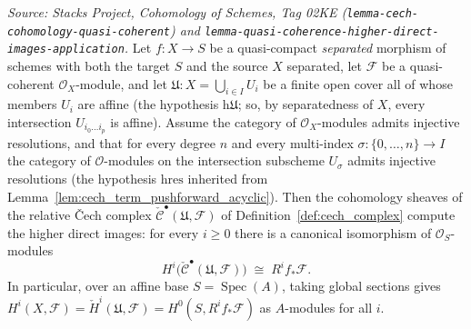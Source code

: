 \begin{lemma}\leanok
  \label{lem:cech_computes_cohomology}
  \textit{Source: Stacks Project, Cohomology of Schemes, Tag 02KE
  (\texttt{lemma-cech-cohomology-quasi-coherent}) and
  \texttt{lemma-quasi-coherence-higher-direct-images-application}.}
  Let \(f : X \to S\) be a quasi-compact \emph{separated} morphism of schemes with
  both the target \(S\) and the source \(X\) separated, let \(\mathcal{F}\) be a
  quasi-coherent \(\mathcal{O}_X\)-module, and let
  \(\mathfrak{U} : X = \bigcup_{i \in I} U_i\) be a finite open cover all of whose
  members \(U_i\) are affine (the hypothesis \(\mathrm{h}\mathfrak{U}\); so, by
  separatedness of \(X\), every intersection \(U_{i_0 \ldots i_p}\) is affine).
  Assume the category of \(\mathcal{O}_X\)-modules admits injective resolutions, and
  that for every degree \(n\) and every multi-index \(\sigma : \{0, \ldots, n\} \to I\)
  the category of \(\mathcal{O}\)-modules on the intersection subscheme \(U_\sigma\)
  admits injective resolutions (the hypothesis \(\mathrm{hres}\) inherited from
  Lemma~\ref{lem:cech_term_pushforward_acyclic}). Then the cohomology sheaves of the
  relative {\v C}ech complex \(\check{\mathcal{C}}^\bullet(\mathfrak{U}, \mathcal{F})\)
  of Definition~\ref{def:cech_complex} compute the higher direct images: for every
  \(i \geq 0\) there is a canonical isomorphism of \(\mathcal{O}_S\)-modules
  \[
    H^i\bigl(\check{\mathcal{C}}^\bullet(\mathfrak{U}, \mathcal{F})\bigr)
      \;\cong\; R^i f_*\mathcal{F}.
  \]
  In particular, over an affine base \(S = \operatorname{Spec}(A)\), taking global
  sections gives \(H^i(X, \mathcal{F}) = \check{H}^i(\mathfrak{U}, \mathcal{F}) =
  H^0(S, R^i f_*\mathcal{F})\) as \(A\)-modules for all \(i\).


\end{lemma}
